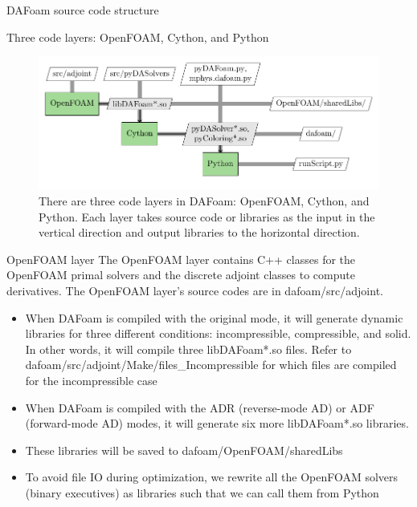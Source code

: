 \documentclass{bredelebeamer}
\begin{document}
\begin{frame}{}
  \center \Large DAFoam source code structure
\end{frame}

\begin{frame}{Three code layers: OpenFOAM, Cython, and Python}
\begin{figure}
\includegraphics[width=1.05\linewidth]{images/dafoam_layers.pdf} 
\caption{There are three code layers in DAFoam: OpenFOAM, Cython, and Python. Each layer takes source code or libraries as the input in the vertical direction and output libraries to the horizontal direction.}
\end{figure}
\end{frame}


\begin{frame}[fragile]{OpenFOAM layer}
  The OpenFOAM layer contains C++ classes for the OpenFOAM primal solvers and the discrete adjoint classes to compute derivatives. The OpenFOAM layer's source codes are in dafoam/src/adjoint.
  \begin{itemize}
    \setlength\itemsep{1em}
    \item When DAFoam is compiled with the original mode, it will generate dynamic libraries for three different conditions: incompressible, compressible, and solid. In other words, it will compile three libDAFoam*.so files. Refer to dafoam/src/adjoint/Make/files\_Incompressible for which files are compiled for the incompressible case
    \item When DAFoam is compiled with the ADR (reverse-mode AD) or ADF (forward-mode AD) modes, it will generate six more libDAFoam*.so libraries.
    \item These libraries will be saved to dafoam/OpenFOAM/sharedLibs
    \item To avoid file IO during optimization, we rewrite all the OpenFOAM solvers (binary executives) as libraries such that we can call them from Python
  \end{itemize}
\end{frame}
\end{document}
